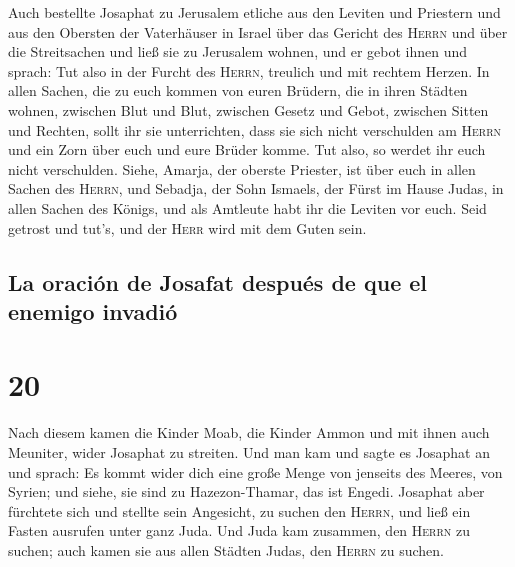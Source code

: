  Auch bestellte Josaphat zu Jerusalem etliche aus den
Leviten und Priestern und aus den Obersten der Vaterhäuser in Israel
über das Gericht des \textsc{Herrn} und über die Streitsachen und ließ
sie zu Jerusalem wohnen,  und er gebot ihnen und sprach:
Tut also in der Furcht des \textsc{Herrn}, treulich und mit rechtem
Herzen.  In allen Sachen, die zu euch kommen von euren
Brüdern, die in ihren Städten wohnen, zwischen Blut und Blut, zwischen
Gesetz und Gebot, zwischen Sitten und Rechten, sollt ihr sie
unterrichten, dass sie sich nicht verschulden am \textsc{Herrn} und ein
Zorn über euch und eure Brüder komme. Tut also, so werdet ihr euch nicht
verschulden.  Siehe, Amarja, der oberste Priester, ist
über euch in allen Sachen des \textsc{Herrn}, und Sebadja, der Sohn
Ismaels, der Fürst im Hause Judas, in allen Sachen des Königs, und als
Amtleute habt ihr die Leviten vor euch. Seid getrost und tut's, und der
\textsc{Herr} wird mit dem Guten sein.

\hypertarget{la-oraciuxf3n-de-josafat-despuuxe9s-de-que-el-enemigo-invadiuxf3}{%
\subsection{La oración de Josafat después de que el enemigo
invadió}\label{la-oraciuxf3n-de-josafat-despuuxe9s-de-que-el-enemigo-invadiuxf3}}

\hypertarget{section-19}{%
\section{20}\label{section-19}}

 Nach diesem kamen die Kinder Moab, die Kinder Ammon und
mit ihnen auch Meuniter, wider Josaphat zu streiten.  Und
man kam und sagte es Josaphat an und sprach: Es kommt wider dich eine
große Menge von jenseits des Meeres, von Syrien; und siehe, sie sind zu
Hazezon-Thamar, das ist Engedi.  Josaphat aber fürchtete
sich und stellte sein Angesicht, zu suchen den \textsc{Herrn}, und ließ
ein Fasten ausrufen unter ganz Juda.  Und Juda kam
zusammen, den \textsc{Herrn} zu suchen; auch kamen sie aus allen Städten
Judas, den \textsc{Herrn} zu suchen.

